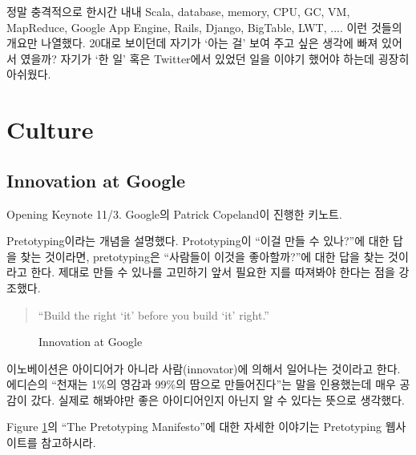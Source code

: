 \documentclass[11pt]{article}
\begin{document}
정말 충격적으로 한시간 내내 Scala, database, memory, CPU, GC, VM,
MapReduce, Google App Engine, Rails, Django, BigTable, LWT, .... 이런
것들의 개요만 나열했다. 20대로 보이던데 자기가 `아는 걸' 보여 주고 싶은 
생각에 빠져 있어서 였을까? 자기가 `한 일' 혹은 Twitter에서 있었던 일을  
이야기 했어야 하는데 굉장히 아쉬웠다.


\section{Culture}

\subsection{Innovation at Google}
Opening Keynote 11/3. Google의 Patrick Copeland이 진행한 키노트.

Pretotyping\cite{pretotype}이라는 개념을 설명했다.
Prototyping이 ``이걸 만들 수 있나?''에 대한 답을 찾는 
것이라면, pretotyping은 ``사람들이 이것을 좋아할까?''에 대한 답을 찾는 
것이라고 한다. 제대로 만들 수 있나를 고민하기 앞서 필요한 지를 따져봐야 
한다는 점을 강조했다.

\begin{quote}
``Build the right `it' before you build `it' right.''
\end{quote}

\begin{figure}[t]
    \begin{Frame}
        \begin{center}
        \end{center}
    \end{Frame}
    \caption{Innovation at Google}
    \label{pretotyping}
\end{figure}

이노베이션은 아이디어가 아니라 사람(innovator)에 의해서 일어나는 것이라고 한다. 
에디슨의 ``천재는 1\%의 영감과 99\%의 땀으로 만들어진다''는 말을
인용했는데 매우 공감이 갔다. 실제로 해봐야만 좋은 아이디어인지 아닌지 
알 수 있다는 뜻으로 생각했다.

Figure \ref{pretotyping}의 ``The Pretotyping Manifesto''에 대한 자세한 
이야기는 Pretotyping 웹사이트를 참고하시라.
\end{document}

